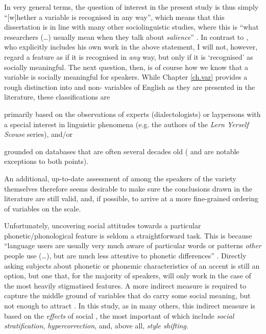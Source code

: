 In very general terms, the question of interest in the present study is thus simply ``[w]hether a variable is recognised in any way'', which means that this dissertation is in line with many other sociolinguistic studies, where this is ``what researchers (\dots) usually mean when they talk about \emph{salience}'' \parencite[4, emphasis in original]{racz2013}.
In contrast to \textcite{racz2013}, who explicitly includes his own work in the above statement, I will not, however, regard a feature as  if it is recognised in \emph{any} way, but only if it is `recognised' as socially meaningful.
The next question, then, is of course how we know that a variable is socially meaningful for speakers.
While Chapter \ref{ch.var} provides a rough distinction into  and non- variables of  English as they are presented in the literature, these classifications are
\begin{inparaenum}[(1)]
	\item primarily based on the observations of experts (dialectologists) or laypersons with a special interest in linguistic phenomena (e.g. the authors of the \emph{Lern Yerself Scouse} series), and/or
	\item grounded on databases that are often several decades old (\citealt{watsonclark2013} and \citealt{watsonclark2015} are notable exceptions to both points).
\end{inparaenum}
An additional, up-to-date assessment of  among the speakers of the variety themselves therefore seems desirable to make sure the conclusions drawn in the literature are still valid, and, if possible, to arrive at a more fine-grained ordering of variables on the  scale.

Unfortunately, uncovering social attitudes towards a particular phonetic/phonological feature is seldom a straightforward task.
This is because ``language users are usually very much aware of particular words or  patterns \emph{other} people use (\ldots), but are much less attentive to phonetic differences'' \parencite[3, emphasis in the original]{racz2013}.
Directly asking subjects about phonetic or phonemic characteristics of an accent is still an option, but one that, for the majority of speakers, will only work in the case of the most heavily stigmatised features.
A more indirect measure is required to capture the middle ground of variables that do carry some social meaning, but not enough to attract .
In this study, as in many others, this indirect measure is based on the \emph{effects} of social , the most important of which include \emph{social stratification}, \emph{hypercorrection}, and, above all, \emph{style shifting}.

